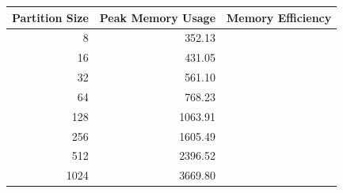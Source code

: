 \begin{tabular}{rrr}
\toprule
Partition Size & Peak Memory Usage& Memory Efficiency \\
\midrule
8    & 352.13\\
16   & 431.05\\
32   & 561.10\\
64   & 768.23\\
128  & 1063.91\\
256  & 1605.49\\
512  & 2396.52\\
1024 & 3669.80\\
\bottomrule
\end{tabular}